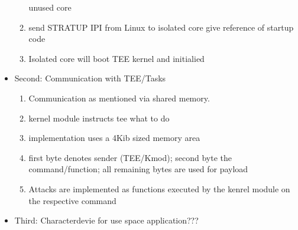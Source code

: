 \begin{itemize}
\begin{enumerate}
                    unused core
              \item send STRATUP IPI from Linux to isolated core give reference
                    of startup code
              \item Isolated core will boot TEE kernel and initialied
          \end{enumerate}
    \item Second: Communication with TEE/Tasks
          \begin{enumerate}
              \item Communication as mentioned via shared memory.
              \item kernel module instructs tee what to do
              \item implementation uses a 4Kib sized memory area
              \item first byte denotes sender (TEE/Kmod); second byte the
                    command/function; all remaining bytes are used for payload
              \item Attacks are implemented as functions executed by the kenrel
                    module on the respective command
          \end{enumerate}
    \item Third: Characterdevie for use space application???
\end{itemize}

